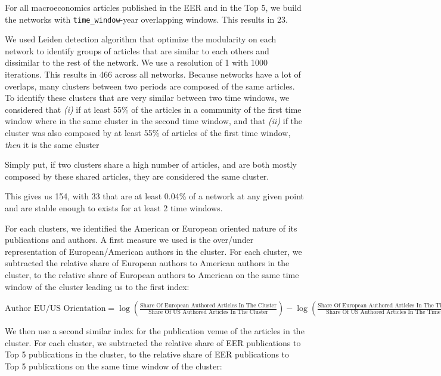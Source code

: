 \documentclass[]{elsarticle} %
\begin{document}
For all macroeconomics articles published in the EER and in the Top 5,
we build the networks with \texttt{time\_window}-year overlapping
windows. This results in 23.

We used Leiden detection algorithm \citep{traag2019} that optimize the
modularity on each network to identify groups of articles that are
similar to each others and dissimilar to the rest of the network. We use
a resolution of 1 with 1000 iterations. This results in 466 across all
networks. Because networks have a lot of overlaps, many clusters between
two periods are composed of the same articles. To identify these
clusters that are very similar between two time windows, we considered
that \emph{(i)} if at least 55\% of the articles in a community of the
first time window where in the same cluster in the second time window,
and that \emph{(ii)} if the cluster was also composed by at least 55\%
of articles of the first time window, \emph{then} it is the same cluster

Simply put, if two clusters share a high number of articles, and are
both mostly composed by these shared articles, they are considered the
same cluster.

This gives us 154, with 33 that are at least 0.04\% of a network at any
given point and are stable enough to exists for at least 2 time windows.

For each clusters, we identified the American or European oriented
nature of its publications and authors. A first measure we used is the
over/under representation of European/American authors in the cluster.
For each cluster, we subtracted the relative share of European authors
to American authors in the cluster, to the relative share of European
authors to American on the same time window of the cluster leading us to
the first index:\newline

\({\scriptstyle \text{Author EU/US Orientation}=\log(\frac{\text{Share Of European Authored Articles In The Cluster}}{\text{Share Of US Authored Articles In The Cluster}})-\log(\frac{\text{Share Of European Authored Articles In The Time Window}}{\text{Share Of US Authored Articles In The Time Window}})}\)

We then use a second similar index for the publication venue of the
articles in the cluster. For each cluster, we subtracted the relative
share of EER publications to Top 5 publications in the cluster, to the
relative share of EER publications to Top 5 publications on the same
time window of the cluster:
\end{document}
